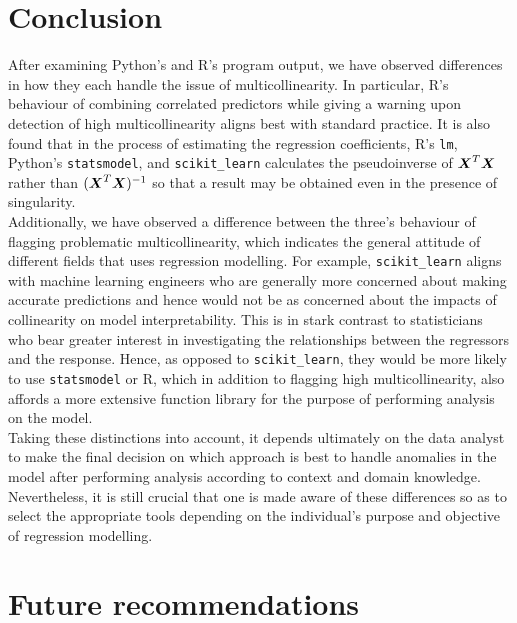 \documentclass[12pt]{article}
\begin{document}
	\section{Conclusion}
	
	After examining Python's and R's program output, we have observed differences in how they each handle the issue of multicollinearity. In particular, R's behaviour of combining correlated predictors while giving a warning upon detection of high multicollinearity aligns best with standard practice. It is also found that in the process of estimating the regression coefficients, R's \texttt{lm}, Python's \texttt{statsmodel}, and \texttt{scikit\_learn} calculates the pseudoinverse of $\boldsymbol{X}^T\boldsymbol{X}$ rather than $(\boldsymbol{X}^T\boldsymbol{X})^{-1}$ so that a result may be obtained even in the presence of singularity.\\
	
	Additionally, we have observed a difference between the three's behaviour of flagging problematic multicollinearity, which indicates the general attitude of different fields that uses regression modelling. For example, \texttt{scikit\_learn} aligns with machine learning engineers who are generally more concerned about making accurate predictions and hence would not be as concerned about the impacts of collinearity on model interpretability. This is in stark contrast to statisticians who bear greater interest in investigating the relationships between the regressors and the response. Hence, as opposed to \texttt{scikit\_learn}, they would be more likely to use \texttt{statsmodel} or R, which in addition to flagging high multicollinearity, also affords a more extensive function library for the purpose of performing analysis on the model.\\
	
	Taking these distinctions into account, it depends ultimately on the data analyst to make the final decision on which approach is best to handle anomalies in the model after performing analysis according to context and domain knowledge. Nevertheless, it is still crucial that one is made aware of these differences so as to select the appropriate tools depending on the individual's purpose and objective of regression modelling. 
	
	\section{Future recommendations\label{sec:future-rec}}
	
\end{document}

